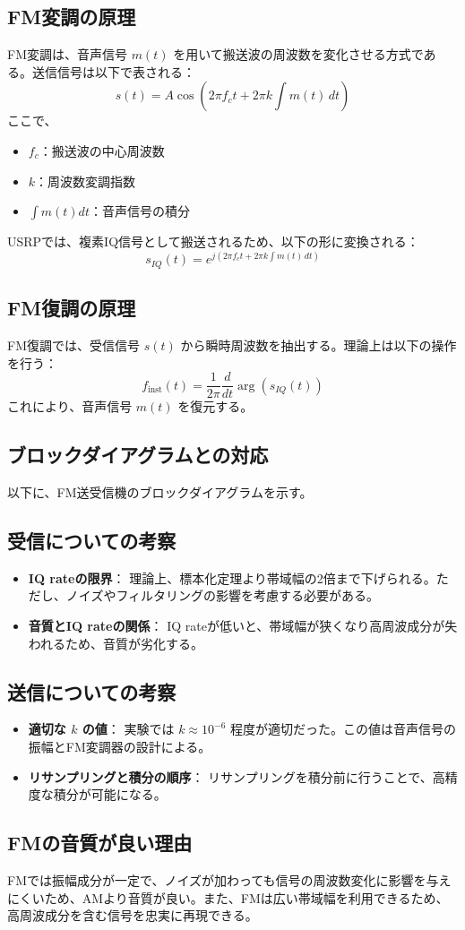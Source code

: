 \documentclass[a4paper, twocolumn]{article} %
\begin{document}
\subsection*{FM変調の原理}
FM変調は、音声信号 \(m(t)\) を用いて搬送波の周波数を変化させる方式である。送信信号は以下で表される：
\[
s(t) = A \cos \left( 2 \pi f_c t + 2 \pi k \int m(t) \, dt \right)
\]
ここで、
\begin{itemize}
    \item \(f_c\)：搬送波の中心周波数
    \item \(k\)：周波数変調指数
    \item \(\int m(t) dt\)：音声信号の積分
\end{itemize}

USRPでは、複素IQ信号として搬送されるため、以下の形に変換される：
\[
s_{IQ}(t) = e^{j \left( 2 \pi f_c t + 2 \pi k \int m(t) \, dt \right)}
\]

\subsection*{FM復調の原理}
FM復調では、受信信号 \(s(t)\) から瞬時周波数を抽出する。理論上は以下の操作を行う：
\[
f_{\text{inst}}(t) = \frac{1}{2 \pi} \frac{d}{dt} \arg \left( s_{IQ}(t) \right)
\]
これにより、音声信号 \(m(t)\) を復元する。

\subsection*{ブロックダイアグラムとの対応}
以下に、FM送受信機のブロックダイアグラムを示す。


\subsection*{受信についての考察}
\begin{itemize}
    \item \textbf{IQ rateの限界}：
    理論上、標本化定理より帯域幅の2倍まで下げられる。ただし、ノイズやフィルタリングの影響を考慮する必要がある。
    \item \textbf{音質とIQ rateの関係}：
    IQ rateが低いと、帯域幅が狭くなり高周波成分が失われるため、音質が劣化する。
\end{itemize}

\subsection*{送信についての考察}
\begin{itemize}
    \item \textbf{適切な \(k\) の値}：
    実験では \(k \approx 10^{-6}\) 程度が適切だった。この値は音声信号の振幅とFM変調器の設計による。
    \item \textbf{リサンプリングと積分の順序}：
    リサンプリングを積分前に行うことで、高精度な積分が可能になる。
\end{itemize}

\subsection*{FMの音質が良い理由}
FMでは振幅成分が一定で、ノイズが加わっても信号の周波数変化に影響を与えにくいため、AMより音質が良い。また、FMは広い帯域幅を利用できるため、高周波成分を含む信号を忠実に再現できる。
\end{document}
